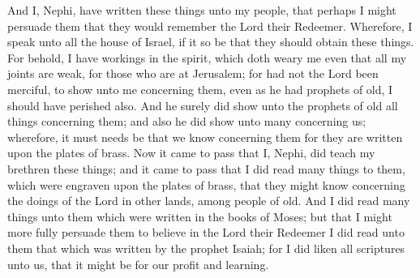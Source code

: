 And I, Nephi, have written these things unto my people, that perhaps I might persuade them that they would remember the Lord their Redeemer.
\bverse \iffalse Wherefore, I speak unto all the house of Israel, if it so be that they should obtain these things. \fi
Wherefore, I speak unto all the house of Israel, if it so be that they should obtain these things.
\bverse \iffalse For behold, I have workings in the spirit, which doth weary me even that all my joints are weak, for those who are at Jerusalem; for had not the Lord been merciful, to show unto me concerning them, even as he had prophets of old, I should have perished also. \fi
For behold, I have workings in the spirit, which doth weary me even that all my joints are weak, for those who are at Jerusalem; for had not the Lord been merciful, to show unto me concerning them, even as he had prophets of old, I should have perished also.
\bverse \iffalse And he surely did show unto the prophets of old all things concerning them; and also he did show unto many concerning us; wherefore, it must needs be that we know concerning them for they are written upon the plates of brass. \fi
And he surely did show unto the prophets of old all things concerning them; and also he did show unto many concerning us; wherefore, it must needs be that we know concerning them for they are written upon the plates of brass.
\bverse \iffalse Now it came to pass that I, Nephi, did teach my brethren these things; and it came to pass that I did read many things to them, which were engraven upon the plates of brass, that they might know concerning the doings of the Lord in other lands, among people of old. \fi
Now it came to pass that I, Nephi, did teach my brethren these things; and it came to pass that I did read many things to them, which were engraven upon the plates of brass, that they might know concerning the doings of the Lord in other lands, among people of old.
\bverse \iffalse And I did read many things unto them which were written in the books of Moses; but that I might more fully persuade them to believe in the Lord their Redeemer I did read unto them that which was written by the prophet Isaiah; for I did liken all scriptures unto us, that it might be for our profit and learning. \fi
And I did read many things unto them which were written in the books of Moses; but that I might more fully persuade them to believe in the Lord their Redeemer I did read unto them that which was written by the prophet Isaiah; for I did liken all scriptures unto us, that it might be for our profit and learning.

